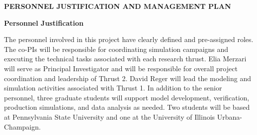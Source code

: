 \documentclass[11pt,letterpaper,english]{article}
\begin{document}
\setlength{\parindent}{0in} %

\pagestyle{fancy}   \renewcommand{%
\headrulewidth}{0.0pt}

\begin{center}
\bf {PERSONNEL JUSTIFICATION AND MANAGEMENT PLAN} \\
\end{center}
\vspace{-.25in}
\justify
{\noindent \bf{Personnel Justification}}

\noindent The personnel involved in this project have clearly defined and pre-assigned roles. The co-PIs will be responsible for coordinating simulation campaigns and executing the technical tasks associated with each research thrust. Elia Merzari will serve as Principal Investigator and will be responsible for overall project coordination and leadership of Thrust 2. David Reger will lead the modeling and simulation activities associated with Thrust 1. In addition to the senior personnel, three graduate students will support model development, verification, production simulations, and data analysis as needed. Two students will be based at Pennsylvania State University and one at the University of Illinois Urbana-Champaign.
\end{document}
